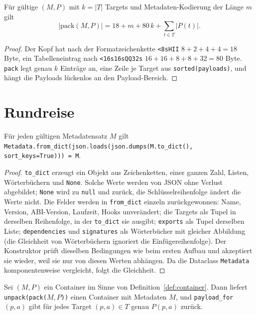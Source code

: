 \begin{lemma}[Größenformel]
	\label{lem:groesse}
	Für gültige $(M,P)$ mit $k=|T|$ Targets und Metadaten-Kodierung der Länge $m$ gilt
	\[
	|\mathrm{pack}(M,P)| = 18 + m + 80\,k + \sum_{t\in T}|P(t)|.
	\]
\end{lemma}

\begin{proof}
	Der Kopf hat nach der Formatzeichenkette \texttt{<8sHII} $8+2+4+4=18$ Byte, ein Tabelleneintrag nach \texttt{<16s16sQQ32s} $16+16+8+8+32=80$ Byte. \texttt{pack} legt genau $k$ Einträge an, eine Zeile je Target aus \texttt{sorted(payloads)}, und hängt die Payloads lückenlos an den Payload-Bereich.
\end{proof}

\section{Rundreise}

\begin{lemma}
	\label{lem:metarund}
	Für jeden gültigen Metadatensatz $M$ gilt \texttt{Metadata.from\_dict(json.loads(json.dumps(M.to\_dict(), sort\_keys=True))) = M}.
\end{lemma}

\begin{proof}
	\texttt{to\_dict} erzeugt ein Objekt aus Zeichenketten, einer ganzen Zahl, Listen, Wörterbüchern und \texttt{None}. Solche Werte werden von JSON ohne Verlust abgebildet; \texttt{None} wird zu \texttt{null} und zurück, die Schlüsselreihenfolge ändert die Werte nicht. Die Felder werden in \texttt{from\_dict} einzeln zurückgewonnen: Name, Version, ABI-Version, Laufzeit, Hooks unverändert; die Targets als Tupel in derselben Reihenfolge, in der \texttt{to\_dict} sie ausgibt; \texttt{exports} als Tupel derselben Liste; \texttt{dependencies} und \texttt{signatures} als Wörterbücher mit gleicher Abbildung (die Gleichheit von Wörterbüchern ignoriert die Einfügereihenfolge). Der Konstruktor prüft dieselben Bedingungen wie beim ersten Aufbau und akzeptiert sie wieder, weil sie nur von diesen Werten abhängen. Da die Dataclass \texttt{Metadata} komponentenweise vergleicht, folgt die Gleichheit.
\end{proof}

\begin{satz}
	\label{satz:rundreise}
	Sei $(M,P)$ ein Container im Sinne von Definition~\ref{def:container}. Dann liefert \texttt{unpack(pack($M,P$))} einen Container mit Metadaten $M$, und \texttt{payload\_for}$(p,a)$ gibt für jedes Target $(p,a)\in T$ genau $P(p,a)$ zurück.
\end{satz}

